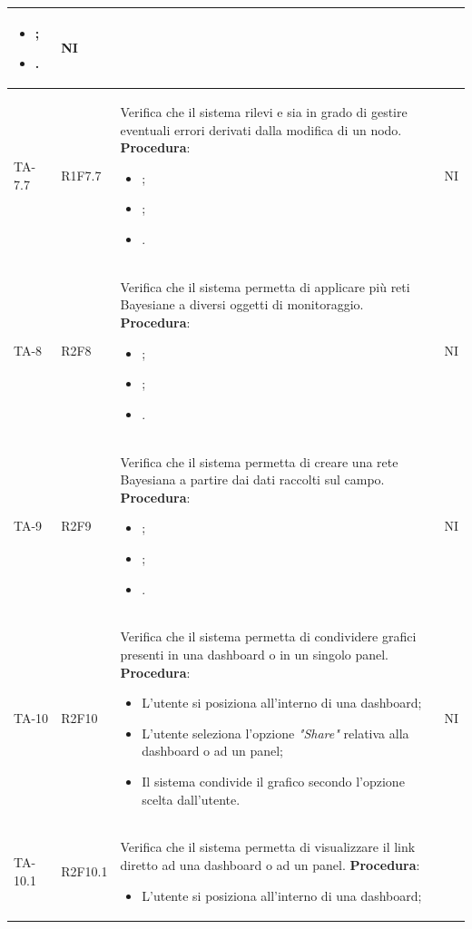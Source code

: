 \begin{longtable}{|C{2.5cm}|C{2.5cm}|L{6.5cm}|C{1.5cm}|}
\begin{itemize}
		\item ;
		\item .
	\end{itemize}
	 & {NI}\\
	\hline
	{TA-7.7} & {R1F7.7} & 
	Verifica che il sistema rilevi e sia in grado di gestire eventuali errori derivati dalla modifica di un nodo.
	\textbf{Procedura}:
	\begin{itemize}		
		\item ;
		\item ;
		\item .
	\end{itemize}
	 & {NI}\\
	\hline
	{TA-8} & {R2F8} & 
	Verifica che il sistema permetta di applicare più reti Bayesiane a diversi oggetti di monitoraggio.
	\textbf{Procedura}:
	\begin{itemize}		
		\item ;
		\item ;
		\item .
	\end{itemize}
	 & {NI}\\
	\hline
	{TA-9} & {R2F9} & 
	Verifica che il sistema permetta di creare una rete Bayesiana a partire dai dati raccolti
	sul campo.
	\textbf{Procedura}:
	\begin{itemize}		
		\item ;
		\item ;
		\item .
	\end{itemize}
	 & {NI}\\
	\hline
	{TA-10} & {R2F10} & 
	Verifica che il sistema permetta di condividere grafici presenti in una dashboard o in un singolo panel.
	\textbf{Procedura}:
	\begin{itemize}		
		\item L'utente si posiziona all'interno di una dashboard;
		\item L'utente seleziona l'opzione \emph{"Share"} relativa alla dashboard o ad un panel;
		\item Il sistema condivide il grafico secondo l'opzione scelta dall'utente.
	\end{itemize}
	 & {NI}\\
	\hline
	{TA-10.1} & {R2F10.1} & 
	Verifica che il sistema permetta di visualizzare il link diretto ad una dashboard o ad un
	panel.
	\textbf{Procedura}:
	\begin{itemize}		
		\item L'utente si posiziona all'interno di una dashboard;

\end{itemize}
\end{longtable}
